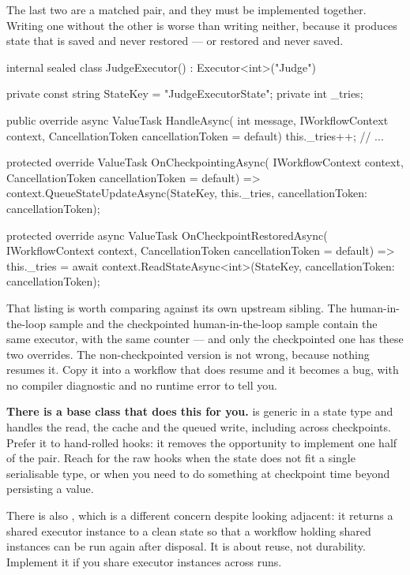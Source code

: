 \noindent
The last two are a matched pair, and they must be implemented together. Writing
one without the other is worse than writing neither, because it produces state
that is saved and never restored --- or restored and never saved.

\begin{csharp}[caption={Making a field durable}, label={lst:dur-hooks}]
internal sealed class JudgeExecutor() : Executor<int>("Judge")
{
    private const string StateKey = "JudgeExecutorState";
    private int _tries;

    public override async ValueTask HandleAsync(
        int message, IWorkflowContext context, CancellationToken cancellationToken = default)
    {
        this._tries++;
        // ...
    }

    protected override ValueTask OnCheckpointingAsync(
        IWorkflowContext context, CancellationToken cancellationToken = default) =>
        context.QueueStateUpdateAsync(StateKey, this._tries, cancellationToken: cancellationToken);

    protected override async ValueTask OnCheckpointRestoredAsync(
        IWorkflowContext context, CancellationToken cancellationToken = default) =>
        this._tries = await context.ReadStateAsync<int>(StateKey, cancellationToken: cancellationToken);
}
\end{csharp}

That listing is worth comparing against its own upstream sibling. The
human-in-the-loop sample and the checkpointed human-in-the-loop sample contain
the same executor, with the same counter --- and only the checkpointed one has
these two overrides. The non-checkpointed version is not wrong, because nothing
resumes it. Copy it into a workflow that does resume and it becomes a bug, with
no compiler diagnostic and no runtime error to tell you.

\begin{note}
\textbf{There is a base class that does this for you.}  is
generic in a state type and handles the read, the cache and the queued write,
including across checkpoints. Prefer it to hand-rolled hooks: it removes the
opportunity to implement one half of the pair. Reach for the raw hooks when the
state does not fit a single serialisable type, or when you need to do something
at checkpoint time beyond persisting a value.
\end{note}

There is also , which is a different concern despite
looking adjacent: it returns a shared executor instance to a clean state so that
a workflow holding shared instances can be run again after disposal. It is about
reuse, not durability. Implement it if you share executor instances across runs.


